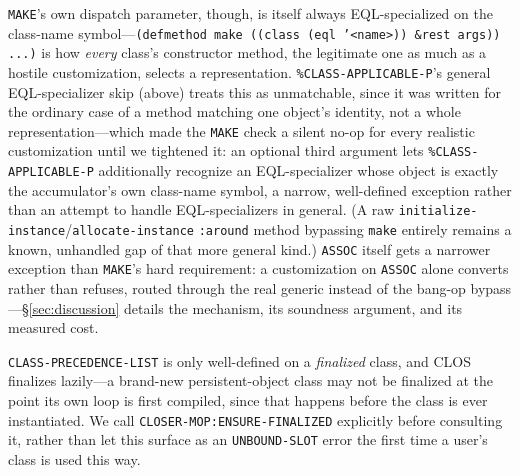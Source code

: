 \documentclass[sigplan,review,anonymous]{acmart}
\begin{document}
\texttt{MAKE}'s own dispatch parameter, though, is itself always EQL-specialized on the class-name symbol---\texttt{(defmethod make ((class (eql '<name>)) \&rest args)) ...)} is how \emph{every} class's constructor method, the legitimate one as much as a hostile customization, selects a representation. \texttt{\%CLASS-APPLICABLE-P}'s general EQL-specializer skip (above) treats this as unmatchable, since it was written for the ordinary case of a method matching one object's identity, not a whole representation---which made the \texttt{MAKE} check a silent no-op for every realistic customization until we tightened it: an optional third argument lets \texttt{\%CLASS-APPLICABLE-P} additionally recognize an EQL-specializer whose object is exactly the accumulator's own class-name symbol, a narrow, well-defined exception rather than an attempt to handle EQL-specializers in general. (A raw \texttt{initialize-instance}/\texttt{allocate-instance} \texttt{:around} method bypassing \texttt{make} entirely remains a known, unhandled gap of that more general kind.) \texttt{ASSOC} itself gets a narrower exception than \texttt{MAKE}'s hard requirement: a customization on \texttt{ASSOC} alone converts rather than refuses, routed through the real generic instead of the bang-op bypass---§\ref{sec:discussion} details the mechanism, its soundness argument, and its measured cost.

\texttt{CLASS-PRECEDENCE-LIST} is only well-defined on a \emph{finalized} class, and CLOS finalizes lazily---a brand-new persistent-object class may not be finalized at the point its own loop is first compiled, since that happens before the class is ever instantiated. We call \texttt{CLOSER-MOP:ENSURE-FINALIZED} explicitly before consulting it, rather than let this surface as an \texttt{UNBOUND-SLOT} error the first time a user's class is used this way.
\end{document}
